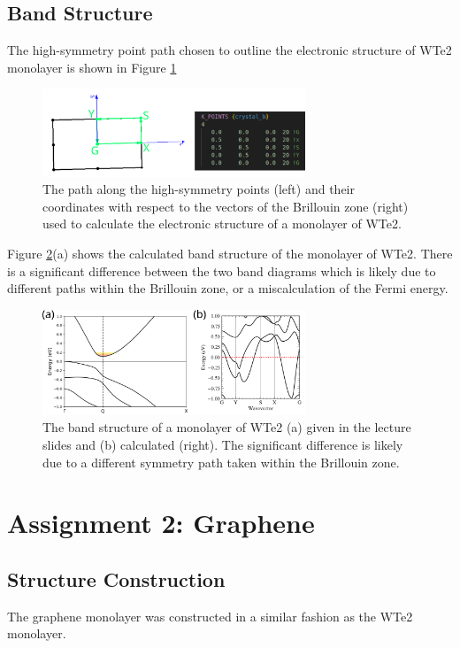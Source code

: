 \documentclass[10pt,a4paper]{labreport}
\begin{document}
\newpage
\subsection{Band Structure}
The high-symmetry point path chosen to outline the electronic structure of WTe2 monolayer is shown in Figure \ref{fig:ass1_kpoints}
\begin{figure}[h]
    \centering 
    \includegraphics[width = 0.7\textwidth]{figs/ass1_WTe2_kpoints.png}
    \caption{The path along the high-symmetry points (left) and their coordinates with respect to the vectors of the Brillouin zone (right) used to calculate the electronic structure of a monolayer of WTe2. }
    \label{fig:ass1_kpoints}
  \end{figure}

Figure \ref{fig:ass1_bands}(a) shows the calculated band structure of the monolayer of WTe2. There is a significant difference between the two band diagrams which is likely due to different paths within the Brillouin zone, or a miscalculation of the Fermi energy. 
\begin{figure}[h]
    \centering 
    \includegraphics[width = 0.7\textwidth]{figs/ass1_bands_both.png}
    \caption{The band structure of a monolayer of WTe2 (a) given in the lecture slides and (b) calculated (right). The significant difference is likely due to a different symmetry path taken within the Brillouin zone.}
    \label{fig:ass1_bands}
  \end{figure}


\newpage
\section{Assignment 2: Graphene}
\subsection{Structure Construction}
The graphene monolayer was constructed in a similar fashion as the WTe2 monolayer.
\end{document}
